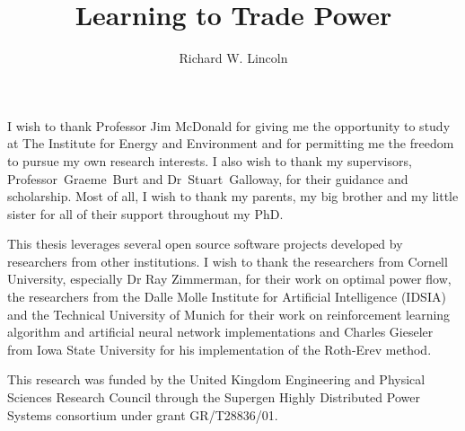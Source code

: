 \documentclass[12pt]{strath_thesis}
\title{Learning to Trade Power}
\author{Richard W. Lincoln}
\begin{document}
\maketitle

\setcounter{page}{1}

\declaration

\begin{acknowledgements}
I wish to thank Professor Jim McDonald for giving me the opportunity to study
at The Institute for Energy and Environment and for permitting me the freedom
to pursue my own research interests.  I also wish to thank my supervisors,
Professor~Graeme~Burt and Dr~Stuart~Galloway, for their guidance and
scholarship.  Most of all, I wish to thank my parents, my big brother and my
little sister for all of their support throughout my PhD.

This thesis leverages several open source software projects developed by
researchers from other institutions.  I wish to thank the researchers from
Cornell University, especially Dr Ray Zimmerman, for their work on optimal power
flow, the researchers from the Dalle Molle Institute for Artificial Intelligence
(IDSIA) and the Technical University of Munich for their work on reinforcement
learning algorithm and artificial neural network implementations and Charles
Gieseler from Iowa State University for his implementation of the Roth-Erev
method.

This research was funded by the United Kingdom Engineering and Physical
Sciences Research Council through the Supergen Highly Distributed Power
Systems consortium under grant GR/T28836/01.
\end{acknowledgements}
\end{document}
